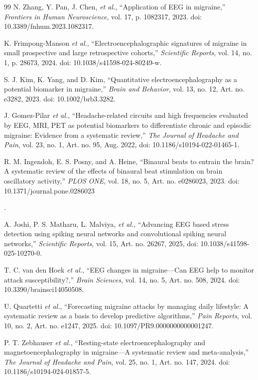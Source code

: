 \documentclass[12pt, a4paper]{report}
\begin{document}
\begin{thebibliography}{99}
N. Zhang, Y. Pan, J. Chen, \textit{et al.}, ``Application of EEG in migraine,'' \textit{Frontiers in Human Neuroscience}, vol. 17, p. 1082317, 2023. doi: 10.3389/fnhum.2023.1082317.

K. Frimpong-Manson \textit{et al.}, ``Electroencephalographic signatures of migraine in small prospective and large retrospective cohorts,'' \textit{Scientific Reports}, vol. 14, no. 1, p. 28673, 2024. doi: 10.1038/s41598-024-80249-w.

S. J. Kim, K. Yang, and D. Kim, ``Quantitative electroencephalography as a potential biomarker in migraine,'' \textit{Brain and Behavior}, vol. 13, no. 12, Art. no. e3282, 2023. doi: 10.1002/brb3.3282.

J. Gomez-Pilar \textit{et al.}, ``Headache-related circuits and high frequencies evaluated by EEG, MRI, PET as potential biomarkers to differentiate chronic and episodic migraine: Evidence from a systematic review,'' \textit{The Journal of Headache and Pain}, vol. 23, no. 1, Art. no. 95, Aug. 2022, doi: 10.1186/s10194-022-01465-1.


R. M. Ingendoh, E. S. Posny, and A. Heine, ``Binaural beats to entrain the brain? A systematic review of the effects of binaural beat stimulation on brain oscillatory activity,'' \textit{PLOS ONE}, vol. 18, no. 5, Art. no. e0286023, 2023. doi: 10.1371/journal.pone.0286023
        
        .
        
A. Joshi, P. S. Matharu, L. Malviya, \textit{et al.}, ``Advancing EEG based stress detection using spiking neural networks and convolutional spiking neural networks,'' \textit{Scientific Reports}, vol. 15, Art. no. 26267, 2025, doi: 10.1038/s41598-025-10270-0.


T. C. van den Hoek \textit{et al.}, ``EEG changes in migraine---Can EEG help to monitor attack susceptibility?,'' \textit{Brain Sciences}, vol. 14, no. 5, Art. no. 508, 2024. doi: 10.3390/brainsci14050508.

U. Quartetti \textit{et al.}, ``Forecasting migraine attacks by managing daily lifestyle: A systematic review as a basis to develop predictive algorithms,'' \textit{Pain Reports}, vol. 10, no. 2, Art. no. e1247, 2025. doi: 10.1097/PR9.0000000000001247.

P. T. Zebhauser \textit{et al.}, ``Resting-state electroencephalography and magnetoencephalography in migraine---A systematic review and meta-analysis,'' \textit{The Journal of Headache and Pain}, vol. 25, no. 1, Art. no. 147, 2024. doi: 10.1186/s10194-024-01857-5.



\end{thebibliography}
\end{document}
